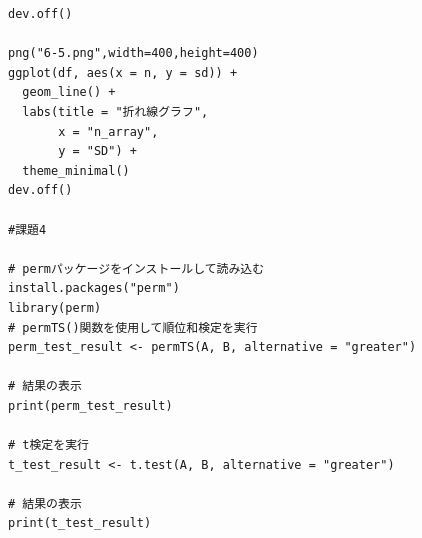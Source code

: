 \documentclass[fontsize = 10pt, paper= a4,twocolumn,column_gap=5zw]{jlreq}
\begin{document}
\begin{lstlisting}[basicstyle=\ttfamily\footnotesize, frame=single, caption=s2212022-1.c ,label=s2212022-1.c]
dev.off()

png("6-5.png",width=400,height=400)
ggplot(df, aes(x = n, y = sd)) +
  geom_line() +
  labs(title = "折れ線グラフ",
       x = "n_array",
       y = "SD") +
  theme_minimal()
dev.off()

#課題4

# permパッケージをインストールして読み込む
install.packages("perm")
library(perm)
# permTS()関数を使用して順位和検定を実行
perm_test_result <- permTS(A, B, alternative = "greater")

# 結果の表示
print(perm_test_result)

# t検定を実行
t_test_result <- t.test(A, B, alternative = "greater")

# 結果の表示
print(t_test_result)
    \end{lstlisting}
\end{document}

